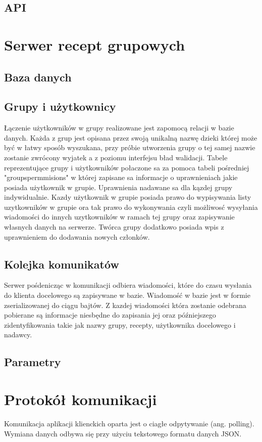 \documentclass[11pt,a4paper,polish,thesis]{dcsbook}
\begin{document}
\subsection{API}
\section{Serwer recept grupowych}
\subsection{Baza danych}
\subsection{Grupy i użytkownicy}
Łączenie użytkowników w grupy realizowane jest zapomocą relacji w bazie danych. 
Każda z grup jest opisana przez swoją unikalną nazwę dzieki której może być w łatwy sposób wyszukana, przy próbie utworzenia grupy o tej samej nazwie zostanie zwrócony wyjatek a z poziomu interfejsu bład walidacji.
Tabele reprezentujące grupy i użytkowników połaczone sa za pomoca tabeli pośredniej "groupspermmisions" w której zapisane sa informacje o uprawnieniach jakie posiada użytkownik w grupie. 
Uprawnienia nadawane sa dla kązdej grupy indywidualnie. 
Kazdy użytkownik w grupie posiada prawo do wypisywania listy uzytkowników w grupie ora tak prawo do wykonywania czyli możliwosć wysyłania wiadomości do innych uzytkowników w ramach tej grupy oraz zapisywanie własnych danych na serwerze.
Twórca grupy dodatkowo posiada wpis z uprawnieniem do dodawania nowych członków. 

\subsection{Kolejka komunikatów}
Serwer pośdenicząc w komunikacji odbiera wiadomości, które do czasu wysłania do klienta docelowego są zapisywane w bazie.
Wiadomość w bazie jest w formie zserializowanej do ciągu bajtów.
Z kazdej wiadomości która zostanie odebrana pobierane są informacje niesbędne do zapisania jej oraz późniejszego zidentyfikowania takie jak nazwy grupy, recepty, użytkownika docelowego i nadawcy.

\subsection{Parametry}
\section{Protokół komunikacji}
Komunikacja aplikacji klienckich oparta jest o ciagłe odpytywanie (ang. polling). 
Wymiana danych odbywa się przy użyciu tekstowego formatu danych JSON. 
\end{document}
